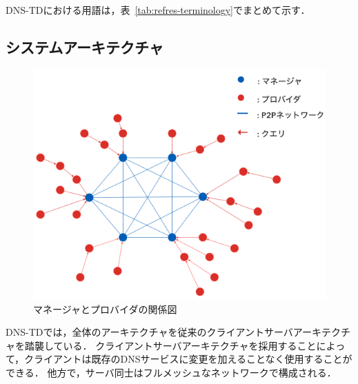 %
DNS-TDにおける用語は，表~\ref{tab:refres-terminology}でまとめて示す．


\newpage
\subsection{システムアーキテクチャ}
\begin{figure}[htbp]
 \centering
 \includegraphics[scale=0.5]{figure/manager-provider.png}
 \caption{マネージャとプロバイダの関係図}
 \label{fig:manager-provider}
\end{figure}

DNS-TDでは，全体のアーキテクチャを従来のクライアントサーバアーキテクチャを踏襲している．
クライアントサーバアーキテクチャを採用することによって，クライアントは既存のDNSサービスに変更を加えることなく使用することができる．
他方で，サーバ同士はフルメッシュなネットワークで構成される．

